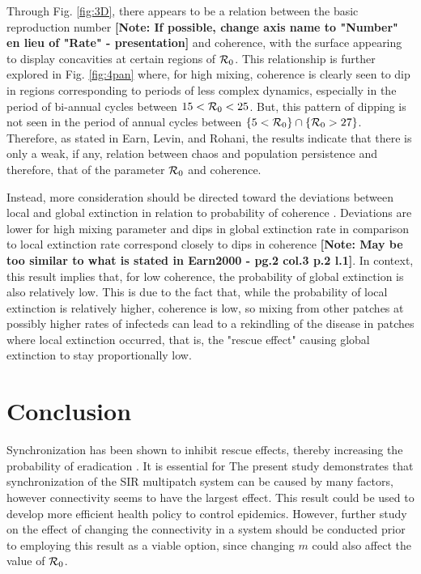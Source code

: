 \documentclass[twocolumn,nofootinbib,showkeys,twoside,floatfix,unsortedaddress,flushbottom,10pt,aps,pra]{report}
\begin{document}
Through Fig. \ref{fig:3D}, there appears to be a relation between the basic reproduction number \textbf{[Note: If possible, change axis name to "Number" en lieu of "Rate" - presentation]} and coherence, with the surface appearing to display concavities at certain regions of ${\cal R}_0$. This relationship is further explored in Fig. \ref{fig:4pan} where, for high mixing, coherence is clearly seen to dip in regions corresponding to periods of less complex dynamics, especially in the period of bi-annual cycles between $15<{\cal R}_0<25$. But, this pattern of dipping is not seen in the period of annual cycles between $\{5<{\cal R}_0\}\cap\{{\cal R}_0>27\}$. Therefore, as stated in Earn, Levin, and Rohani, the results indicate that there is only a weak, if any, relation between chaos and population persistence\cite{Earn2000} and therefore, that of the parameter ${\cal R}_0$ and coherence. \par \smallskip \qquad
Instead, more consideration should be directed toward the deviations between local and global extinction in relation to probability of coherence \cite{Earn2000,Heino1997}. Deviations are lower for high mixing parameter and dips in global extinction rate in comparison to local extinction rate correspond closely to dips in coherence \textbf{[Note: May be too similar to what is stated in Earn2000 - pg.2 col.3 p.2 l.1]}. In context, this result implies that, for low coherence, the probability of global extinction is also relatively low. This is due to the fact that, while the probability of local extinction is relatively higher, coherence is low, so mixing from other patches at possibly higher rates of infecteds can lead to a rekindling of the disease in patches where local extinction occurred, that is, the "rescue effect" causing global extinction to stay proportionally low.
\section{Conclusion} 

Synchronization has been shown to inhibit rescue effects, thereby increasing the probability of eradication  \cite{Earn2000}. It is essential for The present study demonstrates that synchronization of the SIR multipatch system can be caused by many factors, however connectivity seems to have the largest effect. This result could be used to develop more efficient health policy to control epidemics. However, further study on the effect of changing the connectivity in a system should be conducted prior to employing this result as a viable option, since changing $m$ could also affect the value of ${\cal R}_0$. 

\onecolumn
{}%

 
\end{document}
